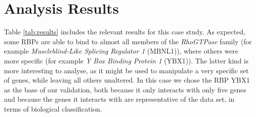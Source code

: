 \section{Analysis Results}

Table \ref{tab:results} includes the relevant results for this case study. As
expected, some RBPs are able to bind to almost all members of the
\emph{RhoGTPase} family (for example \emph{Muscleblind-Like Splicing Regulator
1} (MBNL1)), where others were more specific (for example \emph{Y Box Binding
Protein 1} (YBX1)). The latter kind is more interesting to analyse, as it might
be used to manipulate a very specific set of genes, while leaving all others
unaltered. In this case we chose the RBP YBX1 as the base of our validation,
both because it only interacts with only five genes and because the genes it
interacts with are representative of the data set, in terms of biological
classification.

